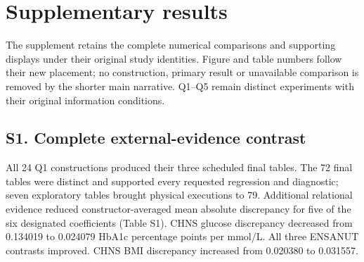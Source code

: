 \documentclass[11pt,letterpaper]{article}
\begin{document}
\endgroup

\clearpage

\appendix

\section*{Supplementary results}

\setcounter{figure}{0}

\renewcommand{\thefigure}{S\arabic{figure}}

\setcounter{table}{0}

\renewcommand{\thetable}{S\arabic{table}}

The supplement retains the complete numerical comparisons and supporting displays under their original study identities. Figure and table numbers follow their new placement; no construction, primary result or unavailable comparison is removed by the shorter main narrative. Q1–\allowbreak{}Q5 remain distinct experiments with their original information conditions.


\subsection*{S1. Complete external-evidence contrast}

All 24 Q1 constructions produced their three scheduled final tables. The 72 final tables were distinct and supported every requested regression and diagnostic; seven exploratory tables brought physical executions to 79. Additional relational evidence reduced constructor-averaged mean absolute discrepancy for five of the six designated coefficients (Table S1). CHNS glucose discrepancy decreased from 0.134019 to 0.024079 HbA1c percentage points per mmol/\allowbreak{}L. All three ENSANUT contrasts improved. CHNS BMI discrepancy increased from 0.020380 to 0.031557.


\FloatBarrier

\begingroup

\small

\renewcommand{\arraystretch}{1.22}
\end{document}
